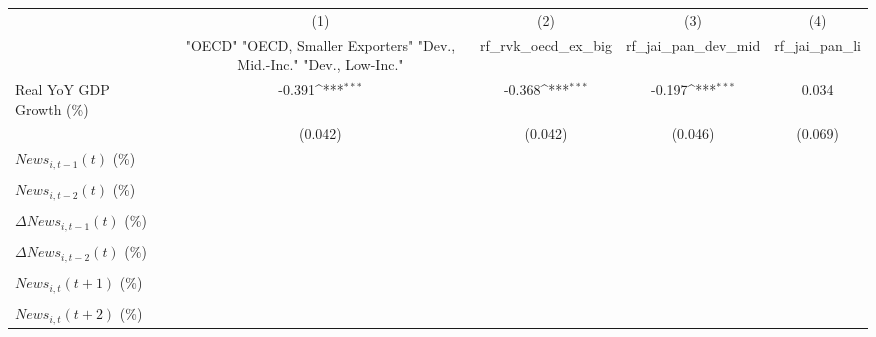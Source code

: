 {
\def\sym#1{\ifmmode^{#1}\else\(^{#1}\)\fi}
\begin{tabular}{l*{4}{c}}
\toprule
                    &\multicolumn{1}{c}{(1)}&\multicolumn{1}{c}{(2)}&\multicolumn{1}{c}{(3)}&\multicolumn{1}{c}{(4)}\\
                    &\multicolumn{1}{c}{ "OECD" "OECD, Smaller Exporters" "Dev., Mid.-Inc." "Dev., Low-Inc."}&\multicolumn{1}{c}{rf_rvk_oecd_ex_big}&\multicolumn{1}{c}{rf_jai_pan_dev_mid}&\multicolumn{1}{c}{rf_jai_pan_li}\\
\midrule
Real YoY GDP Growth (\%)&      -0.391\sym{***}&      -0.368\sym{***}&      -0.197\sym{***}&       0.034         \\
                    &     (0.042)         &     (0.042)         &     (0.046)         &     (0.069)         \\
\addlinespace
$ News_{i,t-1}(t)$ (\%)&                     &                     &                     &                     \\
                    &                     &                     &                     &                     \\
\addlinespace
$ News_{i,t-2}(t)$ (\%)&                     &                     &                     &                     \\
                    &                     &                     &                     &                     \\
\addlinespace
$ \Delta News_{i,t-1}(t)$ (\%)&                     &                     &                     &                     \\
                    &                     &                     &                     &                     \\
\addlinespace
$ \Delta News_{i,t-2}(t)$ (\%)&                     &                     &                     &                     \\
                    &                     &                     &                     &                     \\
\addlinespace
$ News_{i,t}(t+1)$ (\%)&                     &                     &                     &                     \\
                    &                     &                     &                     &                     \\
\addlinespace
$ News_{i,t}(t+2)$ (\%)&                     &                     &                     &                     \\

\end{tabular}}
